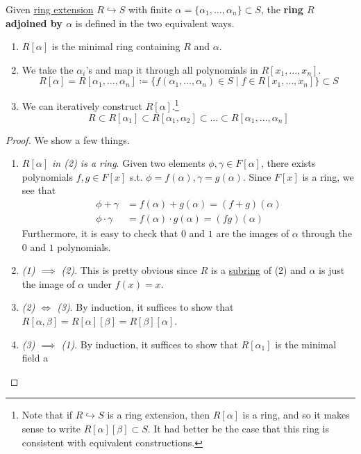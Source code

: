   \begin{definition} 
    \label{def:adjoining_ring}
    Given \hyperref[def:ring-extension]{ring extension} $R \hookrightarrow S$ with finite $\alpha = \{\alpha_1, \ldots, \alpha_n\} \subset S$, the \textbf{ring $R$ adjoined by $\alpha$} is defined in the two equivalent ways. 
    \begin{enumerate}
      \item $R[\alpha]$ is the minimal ring containing $R$ and $\alpha$. 

      \item We take the $\alpha_i$'s and map it through all polynomials in $R[x_1, \ldots, x_n]$. 
      \begin{equation}
        R[\alpha] = R[\alpha_1, \ldots, \alpha_n] \coloneqq \{ f(\alpha_1, \ldots, \alpha_n) \in S \mid f \in R[x_1, \ldots, x_n]\} \subset S
      \end{equation} 

      \item We can iteratively construct $R[\alpha]$.\footnote{Note that if $R \hookrightarrow S$ is a ring extension, then $R[\alpha]$ is a ring, and so it makes sense to write $R[\alpha][\beta] \subset S$. It had better be the case that this ring is consistent with equivalent constructions.} 
      \begin{equation}
        R \subset R[\alpha_1] \subset R[\alpha_1, \alpha_2] \subset \ldots \subset R[\alpha_1, \ldots, \alpha_n] 
      \end{equation}
    \end{enumerate}
  \end{definition} 
  \begin{proof}
    We show a few things. 
    \begin{enumerate}
      \item \textit{$R[\alpha]$ in (2) is a ring}. Given two elements $\phi, \gamma \in F[\alpha]$, there exists polynomials $f, g \in F[x]$ s.t. $\phi = f(\alpha), \gamma = g(\alpha)$. Since $F[x]$ is a ring, we see that 
      \begin{align}
        \phi + \gamma & = f(\alpha) + g(\alpha) = (f + g)(\alpha) \\
        \phi \cdot \gamma & = f(\alpha) \cdot g(\alpha) = (fg)(\alpha)
      \end{align} 
      Furthermore, it is easy to check that $0$ and $1$ are the images of $\alpha$ through the $0$ and $1$ polynomials. 
      \item \textit{(1) $\implies$ (2)}. This is pretty obvious since $R$ is a \hyperref[def:subring]{subring} of (2) and $\alpha$ is just the image of $\alpha$ under $f(x) = x$. 
      \item \textit{(2) $\iff$ (3)}. By induction, it suffices to show that $R[\alpha, \beta] = R[\alpha][\beta] = R[\beta][\alpha]$. 
      \item \textit{(3) $\implies$ (1)}. By induction, it suffices to show that $R[\alpha_1]$ is the minimal field a
    \end{enumerate}
  \end{proof} 

